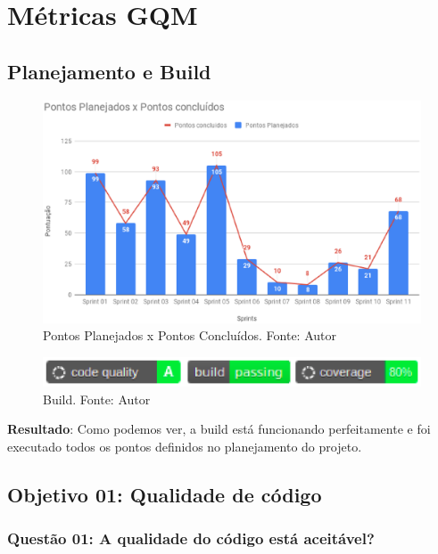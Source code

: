 \section{Métricas GQM}

\subsection{Planejamento e Build}

\begin{figure}[h!]
	\centering
  \includegraphics[keepaspectratio=true,scale=0.5]{figuras/pontos_planejados.eps}
  \caption[Pontos Planejados x Pontos Concluídos.]{Pontos Planejados x Pontos Concluídos. Fonte: Autor}
	\label{fig:planejamento}
\end{figure}

\begin{figure}[h!]
	\centering
  \includegraphics[keepaspectratio=true,scale=0.8]{figuras/build.eps}
  \caption[Build.]{Build. Fonte: Autor}
	\label{fig:build}
\end{figure}

\textbf{Resultado}: Como podemos ver, a build está funcionando perfeitamente e foi executado todos os pontos definidos
no planejamento do projeto.

\subsection{Objetivo 01: Qualidade de código}

\subsubsection{Questão 01: A qualidade do código está aceitável?}


